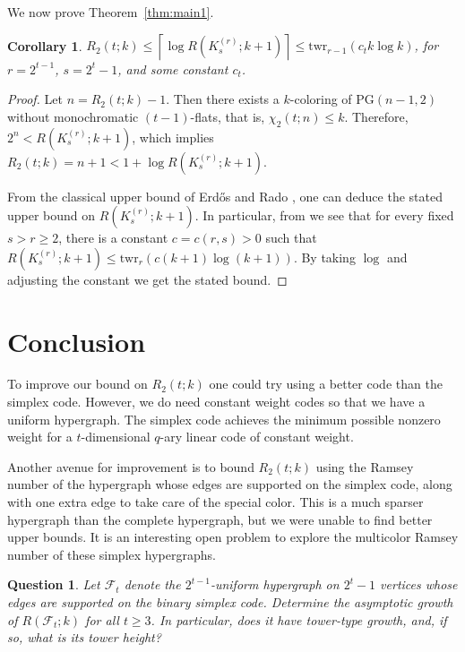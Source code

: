 \documentclass[a4paper,11pt]{amsproc}
\theoremstyle{plain}
\newtheorem{Corollary} [Theorem] {Corollary}
\newtheorem{Question} [Theorem] {Question}
\theoremstyle{definition}
\begin{document}
We now prove Theorem~\ref{thm:main1}.
\begin{Corollary}
    $R_2(t; k) \leq \left\lceil \log R(K_s^{(r)}; k + 1) \right\rceil \leq \mathrm{twr}_{r-1}(c_t k\log k)$,  for $r = 2^{t - 1}$, $s = 2^t - 1$, and some constant $c_t$.
\end{Corollary}
\begin{proof}
    Let $n = R_2(t; k) - 1$.
    Then there exists a $k$-coloring of $\mathrm{PG}(n - 1, 2)$ without monochromatic $(t - 1)$-flats, that is, $\chi_2(t; n) \leq k$.
    Therefore, $2^n < R(K_s^{(r)}; k + 1)$, which implies 
    $R_2(t; k) = n + 1 < 1 + \log R(K_s^{(r)}; k + 1)$.

    From the classical upper bound of Erd\H{o}s and Rado
\cite[Theorem~1, pp.~420--423]{ErdosRado1952}, one can deduce the stated upper bound on $R(K_s^{(r)}; k + 1)$. 
In particular, from \cite[Theorem~1]{AxenovichGyarfasLiuMubayi2014} we see that 
for every fixed $s>r\geq 2$, there is a constant
$c=c(r,s)>0$ such that $R(K_s^{(r)}; k + 1) \leq \mathrm{twr}_r(c (k + 1) \log(k + 1))$. 
By taking $\log$ and adjusting the constant we get the stated bound. 
\end{proof}


\section{Conclusion}
\label{sec4}
To improve our bound on $R_2(t; k)$ one could try using a better code than the simplex code. 
However, we do need constant weight codes so that we have a uniform hypergraph. 
The simplex code achieves the minimum possible nonzero weight for a $t$-dimensional $q$-ary linear code of constant weight.

Another avenue for improvement is to bound $R_2(t; k)$ using the Ramsey number of the hypergraph whose edges are supported on the simplex code, along with one extra edge to take care of the special color. 
This is a much sparser hypergraph than the complete hypergraph, but we were unable to find better upper bounds.
It is an interesting open problem to explore the multicolor Ramsey number of these simplex hypergraphs. 

\begin{Question}
    Let $\mathcal{F}_t$ denote the $2^{t - 1}$-uniform hypergraph on $2^t - 1$ vertices whose edges are supported on the binary simplex code. 
    Determine the asymptotic growth of $R(\mathcal{F}_t; k)$ for all $t \geq 3$.
    In particular, does it have tower-type growth, and, if so, what is its tower height?
\end{Question}
\end{document}
